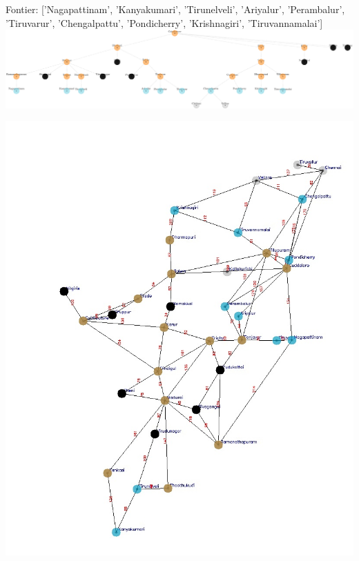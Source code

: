 \documentclass[xcolor=table]{beamer}
\begin{document}
\begin{frame}
  { \tiny Fontier: ['Nagapattinam', 'Kanyakumari', 'Tirunelveli', 'Ariyalur', 'Perambalur', 'Tiruvarur', 'Chengalpattu', 'Pondicherry', 'Krishnagiri', 'Tiruvannamalai']}
  \includegraphics[width=1\textwidth]{../BFSNodes/30-1.png}
  \begin{center}
    \includegraphics[height=0.55\textheight]{../BFSoutput/tamilBFS28.jpg}
  \end{center}
\end{frame}
\end{document}

